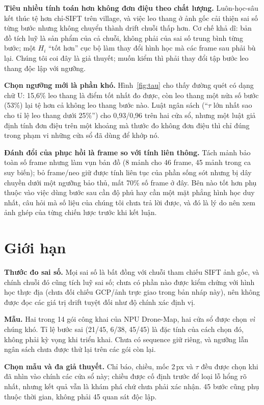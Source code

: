 \documentclass[conference]{IEEEtran}
\begin{document}
\textbf{Tiêu nhiều tính toán hơn không đơn điệu theo chất lượng.}
Luôn-học-sâu kết thúc tệ hơn chỉ-SIFT trên village, và việc leo thang ở ảnh gốc
cải thiện sai số từng bước nhưng không chuyển thành drift chuỗi thấp hơn. Cơ
chế khả dĩ: bản đồ tích luỹ là sản phẩm của cả chuỗi, không phải của sai số
trung bình từng bước; một $H_i$ ``tốt hơn'' cục bộ làm thay đổi hình học mà các
frame sau phải bù lại. Chúng tôi coi đây là giả thuyết; muốn kiểm thì phải thay
đổi tập bước leo thang độc lập với ngưỡng.

\textbf{Chọn ngưỡng mới là phần khó.} Hình~\ref{fig:tau} cho thấy đường quét có
dạng chữ U: 15,6\% leo thang là điểm tốt nhất đo được, còn leo thang một nửa số
bước (53\%) lại tệ hơn cả không leo thang bước nào. Luật ngân sách (``$\tau$
lớn nhất sao cho tỉ lệ leo thang dưới 25\%'') cho 0,93/0,96 trên hai cửa sổ,
nhưng một luật giả định tính đơn điệu trên một khoảng mà thước đo không đơn
điệu thì chỉ đúng trong phạm vi những cửa sổ đã dùng để khớp nó.

\textbf{Đánh đổi của phục hồi là frame so với tính liên thông.} Tách mảnh bảo
toàn số frame nhưng làm vụn bản đồ (8 mảnh cho 46 frame, 45 mảnh trong ca suy
biến); bỏ frame/neo giữ được tính liên tục của phần sống sót nhưng bị dây
chuyền dưới một ngưỡng bảo thủ, mất 70\% số frame ở đây. Bên nào tốt hơn phụ
thuộc vào việc dùng bước sau cần độ phủ hay cần một mặt phẳng hình học duy
nhất, câu hỏi mà số liệu của chúng tôi chưa trả lời được, và đó là lý do nên
xem ảnh ghép của từng chiến lược trước khi kết luận.

\section{Giới hạn}
\textbf{Thước đo sai số.} Mọi sai số là bất đồng với chuỗi tham chiếu SIFT ảnh
gốc, và chính chuỗi đó cũng tích luỹ sai số; chưa có phần nào được kiểm chứng
với hình học thực địa (chưa đối chiếu GCP/ảnh trực giao trong bản nháp này),
nên không được đọc các giá trị drift tuyệt đối như độ chính xác định vị.

\textbf{Mẫu.} Hai trong 14 gói công khai của NPU Drone-Map, hai cửa sổ được
chọn \emph{vì} chúng khó. Tỉ lệ bước sai (21/45, 6/38, 45/45) là đặc tính của
cách chọn đó, không phải kỳ vọng khi triển khai. Chưa có sequence giữ riêng, và
ngưỡng lẫn ngân sách chưa được thử lại trên các gói còn lại.

\textbf{Chọn mẫu và đa giả thuyết.} Chỉ báo, chiều, mốc 2\,px và $\tau$ đều
được chọn khi đã nhìn vào chính các cửa sổ này; chiều được cố định trước để loại
lỗ hổng rõ nhất, nhưng kết quả vẫn là khám phá chứ chưa phải xác nhận. 45 bước
cũng phụ thuộc thời gian, không phải 45 quan sát độc lập.
\end{document}
